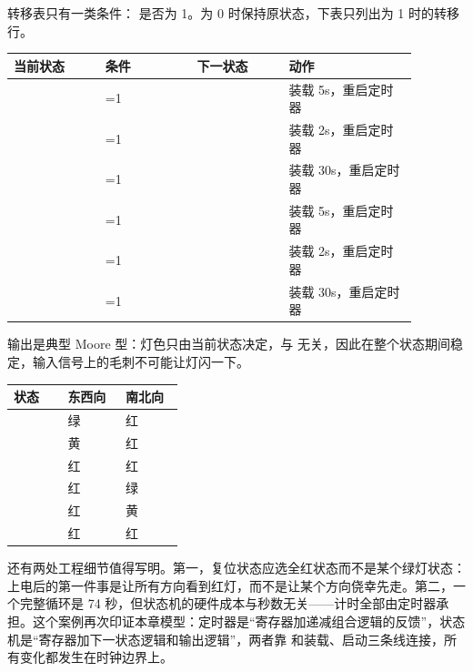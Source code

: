 转移表只有一类条件： 是否为 1。为 0 时保持原状态，下表只列出为 1 时的转移行。

\begin{longtable}{L{0.2\linewidth}L{0.2\linewidth}L{0.2\linewidth}L{0.28\linewidth}}
\toprule
当前状态 & 条件 & 下一状态 & 动作 \\
\midrule
{} & =1 &  & 装载 5s，重启定时器 \\\tablerowrule
{} & =1 &  & 装载 2s，重启定时器 \\\tablerowrule
{} & =1 &  & 装载 30s，重启定时器 \\\tablerowrule
{} & =1 &  & 装载 5s，重启定时器 \\\tablerowrule
{} & =1 &  & 装载 2s，重启定时器 \\\tablerowrule
{} & =1 &  & 装载 30s，重启定时器 \\
\bottomrule
\end{longtable}

输出是典型 Moore 型：灯色只由当前状态决定，与  无关，因此在整个状态期间稳定，输入信号上的毛刺不可能让灯闪一下。

\begin{longtable}{L{0.28\linewidth}L{0.3\linewidth}L{0.3\linewidth}}
\toprule
状态 & 东西向 & 南北向 \\
\midrule
{} & 绿 & 红 \\\tablerowrule
{} & 黄 & 红 \\\tablerowrule
{} & 红 & 红 \\\tablerowrule
{} & 红 & 绿 \\\tablerowrule
{} & 红 & 黄 \\\tablerowrule
{} & 红 & 红 \\
\bottomrule
\end{longtable}

还有两处工程细节值得写明。第一，复位状态应选全红状态而不是某个绿灯状态：上电后的第一件事是让所有方向看到红灯，而不是让某个方向侥幸先走。第二，一个完整循环是 74 秒，但状态机的硬件成本与秒数无关——计时全部由定时器承担。这个案例再次印证本章模型：定时器是“寄存器加递减组合逻辑的反馈”，状态机是“寄存器加下一状态逻辑和输出逻辑”，两者靠  和装载、启动三条线连接，所有变化都发生在时钟边界上。

